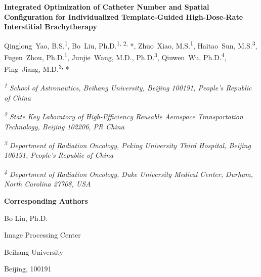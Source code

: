 \documentclass[12pt,twoside,letterpaper]{article}
\begin{document}
\raggedbottom

\begin{center}

{\Large\bfseries Integrated Optimization of Catheter Number and Spatial Configuration for Individualized Template-Guided High-Dose-Rate Interstitial Brachytherapy\par}

\vspace{6mm}

Qinglong~Yao, B.S.\textsuperscript{1}, Bo~Liu, Ph.D.\textsuperscript{1, 2,} *, Zhuo~Xiao, M.S.\textsuperscript{1}, Haitao~Sun, M.S.\textsuperscript{3}, Fugen~Zhou, Ph.D.\textsuperscript{1}, Junjie~Wang, M.D., Ph.D.\textsuperscript{3}, Qiuwen~Wu, Ph.D.\textsuperscript{4}, Ping~Jiang, M.D.\textsuperscript{3,} *\par

\vspace{4mm}

{\small

\emph{\textsuperscript{1} School of Astronautics, Beihang University, Beijing 100191, People's Republic of China}\par

\emph{\textsuperscript{2} State Key Laboratory of High-Efficiency Reusable Aerospace Transportation Technology, Beijing 102206, PR China}\par

\emph{\textsuperscript{3} Department of Radiation Oncology, Peking University Third Hospital, Beijing 100191, People's Republic of China}\par

\emph{\textsuperscript{4} Department of Radiation Oncology, Duke University Medical Center, Durham, North Carolina 27708, USA}\par

}

\end{center}

\textbf{Corresponding Authors}\par

\begingroup\small\setlength{\parskip}{0.4ex}

Bo Liu, Ph.D.\par

Image Processing Center\par

Beihang University\par

Beijing, 100191\par
\end{document}
